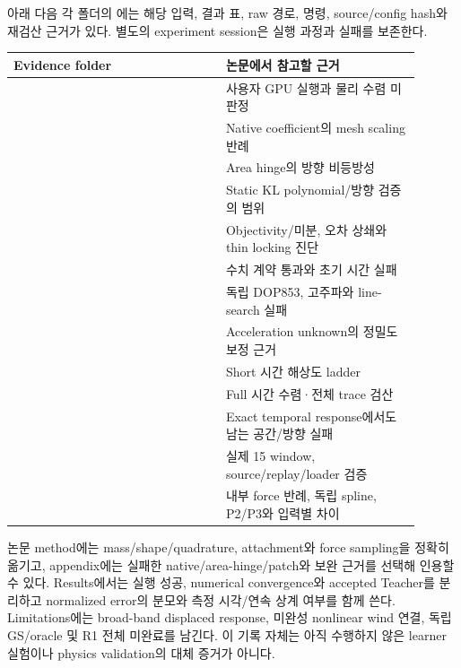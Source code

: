 \documentclass[10pt]{article}
\begin{document}
 아래 다음 각 폴더의 에는 해당 입력, 결과 표, raw 경로,
명령, source/config hash와 재검산 근거가 있다. 별도의 experiment session은 실행 과정과 실패를 보존한다.
\begin{longtable}{L{0.47\linewidth}L{0.43\linewidth}}
\toprule Evidence folder & 논문에서 참고할 근거\\\midrule
{} & 사용자 GPU 실행과 물리 수렴 미판정\\
 & Native coefficient의 mesh scaling 반례\\
 & Area hinge의 방향 비등방성\\
 & Static KL polynomial/방향 검증의 범위\\
 & Objectivity/미분, 오차 상쇄와 thin locking 진단\\
 & 수치 계약 통과와 초기 시간 실패\\
 & 독립 DOP853, 고주파와 line-search 실패\\
 & Acceleration unknown의 정밀도 보정 근거\\
 & Short 시간 해상도 ladder\\
 & Full 시간 수렴·전체 trace 검산\\
 & Exact temporal response에서도 남는 공간/방향 실패\\
 & 실제 15 window, source/replay/loader 검증\\
 & 내부 force 반례, 독립 spline, P2/P3와 입력별 차이\\
\bottomrule\end{longtable}

논문 method에는 mass/shape/quadrature, attachment와 force sampling을 정확히 옮기고,
appendix에는 실패한 native/area-hinge/patch와 보완 근거를 선택해 인용할 수 있다.
Results에서는 실행 성공, numerical convergence와 accepted Teacher를 분리하고 normalized error의
분모와 측정 시각/연속 상계 여부를 함께 쓴다. Limitations에는 broad-band displaced response,
미완성 nonlinear wind 연결, 독립 GS/oracle 및 R1 전체 미완료를 남긴다.
이 기록 자체는 아직 수행하지 않은 learner 실험이나 physics validation의 대체 증거가 아니다.
\end{document}
